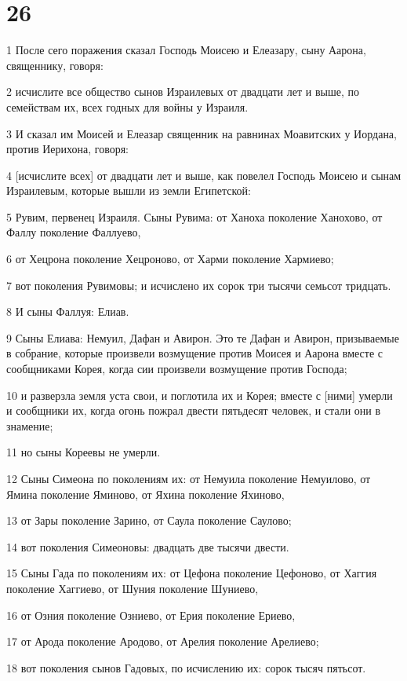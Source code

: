 \chapter{26}

\par 1 После сего поражения сказал Господь Моисею и Елеазару, сыну Аарона, священнику, говоря:
\par 2 исчислите все общество сынов Израилевых от двадцати лет и выше, по семействам их, всех годных для войны у Израиля.
\par 3 И сказал им Моисей и Елеазар священник на равнинах Моавитских у Иордана, против Иерихона, говоря:
\par 4 [исчислите всех] от двадцати лет и выше, как повелел Господь Моисею и сынам Израилевым, которые вышли из земли Египетской:
\par 5 Рувим, первенец Израиля. Сыны Рувима: от Ханоха поколение Ханохово, от Фаллу поколение Фаллуево,
\par 6 от Хецрона поколение Хецроново, от Харми поколение Хармиево;
\par 7 вот поколения Рувимовы; и исчислено их сорок три тысячи семьсот тридцать.
\par 8 И сыны Фаллуя: Елиав.
\par 9 Сыны Елиава: Немуил, Дафан и Авирон. Это те Дафан и Авирон, призываемые в собрание, которые произвели возмущение против Моисея и Аарона вместе с сообщниками Корея, когда сии произвели возмущение против Господа;
\par 10 и разверзла земля уста свои, и поглотила их и Корея; вместе с [ними] умерли и сообщники их, когда огонь пожрал двести пятьдесят человек, и стали они в знамение;
\par 11 но сыны Кореевы не умерли.
\par 12 Сыны Симеона по поколениям их: от Немуила поколение Немуилово, от Ямина поколение Яминово, от Яхина поколение Яхиново,
\par 13 от Зары поколение Зарино, от Саула поколение Саулово;
\par 14 вот поколения Симеоновы: двадцать две тысячи двести.
\par 15 Сыны Гада по поколениям их: от Цефона поколение Цефоново, от Хаггия поколение Хаггиево, от Шуния поколение Шуниево,
\par 16 от Озния поколение Озниево, от Ерия поколение Ериево,
\par 17 от Арода поколение Ародово, от Арелия поколение Арелиево;
\par 18 вот поколения сынов Гадовых, по исчислению их: сорок тысяч пятьсот.
